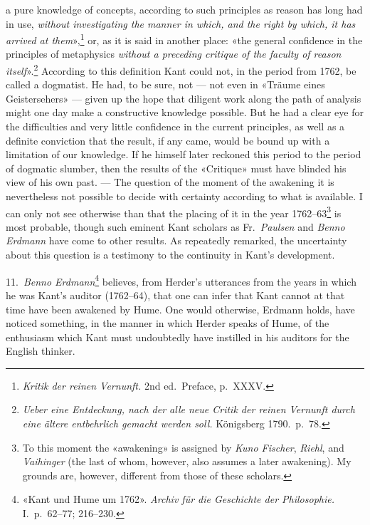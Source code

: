 \documentclass[12pt,a4paper]{article}
\newcommand{\opage}[1]{\marginnote{\footnotesize\textit{[#1]}}}
\begin{document}
a pure knowledge of concepts, according to such principles as reason has
long had in use, \emph{without investigating the manner in which, and the right
by which, it has arrived at them}»,\footnote{\textit{Kritik der reinen
Vernunft.} 2nd ed.\ Preface, p.\ XXXV.} or, as it is said in another
place: «the general confidence in the principles of metaphysics \emph{without a
preceding critique of the faculty of reason itself}».\footnote{\textit{Ueber
eine Entdeckung, nach der alle neue Critik der reinen Vernunft durch eine
ältere entbehrlich gemacht werden soll.} Königsberg 1790.\ p.\ 78.}
According to this definition Kant could not, in the period from 1762, be
called a dogmatist. He had, to be sure, not --- not even in «Träume eines
Geistersehers» --- given up the hope that diligent work along the path of
analysis might one day make a constructive knowledge possible. But he had
a clear eye for the difficulties and very little confidence in the current
principles, as well as a definite conviction that the result, if any came,
would be bound up with a limitation of our knowledge. If he himself later
reckoned this period to the period of dogmatic slumber, then the results of
the «Critique» must have blinded his view of his own past. --- The question
of the moment of the awakening it is nevertheless not possible to decide
with certainty according to what is available. I can only not see otherwise
than that the placing of it in the year 1762--63\footnote{To this moment
the «awakening» is assigned by \emph{Kuno Fischer}, \emph{Riehl}, and \emph{Vaihinger} (the
last of whom, however, also assumes a later awakening). My grounds are,
however, different from those of these scholars.} is most probable, though
such eminent Kant scholars as Fr.\ \emph{Paulsen} and \emph{Benno Erdmann} have come \opage{24}to
other results. As repeatedly remarked, the uncertainty about this question
is a testimony to the continuity in Kant's development.

11.\ \emph{Benno Erdmann}\footnote{«Kant und Hume um 1762». \textit{Archiv für
die Geschichte der Philosophie.} I.\ p.\ 62--77; 216--230.} believes, from
Herder's utterances from the years in which he was Kant's auditor
(1762--64), that one can infer that Kant cannot at that time have been
awakened by Hume. One would otherwise, Erdmann holds, have noticed
something, in the manner in which Herder speaks of Hume, of the enthusiasm
which Kant must undoubtedly have instilled in his auditors for the English
thinker.
\end{document}
